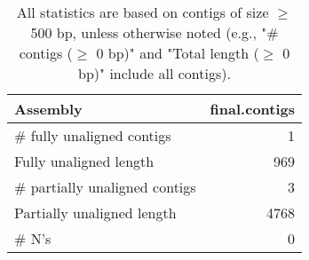 \documentclass[12pt,a4paper]{article}
\begin{document}
\begin{table}[ht]
\begin{center}
\caption{All statistics are based on contigs of size $\geq$ 500 bp, unless otherwise noted (e.g., "\# contigs ($\geq$ 0 bp)" and "Total length ($\geq$ 0 bp)" include all contigs).}
\begin{tabular}{|l*{1}{|r}|}
\hline
Assembly & final.contigs \\ \hline
\# fully unaligned contigs & 1 \\ \hline
Fully unaligned length & 969 \\ \hline
\# partially unaligned contigs & 3 \\ \hline
Partially unaligned length & 4768 \\ \hline
\# N's & 0 \\ \hline
\end{tabular}
\end{center}
\end{table}
\end{document}
